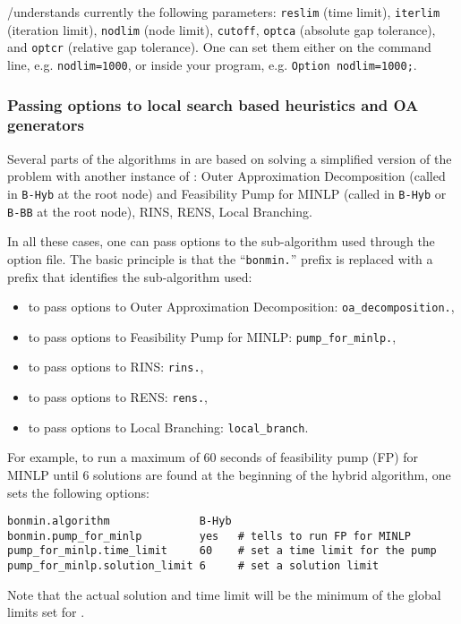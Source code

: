 \MYGAMS/\BONMIN understands currently the following \MYGAMS parameters: \texttt{reslim} (time limit), \texttt{iterlim} (iteration limit), \texttt{nodlim} (node limit), \texttt{cutoff}, \texttt{optca} (absolute gap tolerance), and \texttt{optcr} (relative gap tolerance).
One can set them either on the command line, e.g. \verb+nodlim=1000+, or inside your \MYGAMS program, e.g. \verb+Option nodlim=1000;+.

\subsubsection{Passing options to local search based heuristics and OA generators}
Several parts of the algorithms in \BONMIN are based on solving a simplified version of the problem with another instance of \BONMIN:
Outer Approximation Decomposition (called in {\tt B-Hyb} at the root node)
and Feasibility Pump for MINLP (called in {\tt B-Hyb} or {\tt B-BB} at the root node), RINS, RENS, Local Branching.

In all these cases, one can pass options to the sub-algorithm used through the option file.
The basic principle is that the ``\texttt{bonmin.}'' prefix  is replaced with a prefix that identifies the sub-algorithm used:
\begin{itemize}
\vspace{-2ex}
\setlength{\parskip}{.2ex}
\setlength{\itemsep}{0pt}
\setlength{\partopsep}{0pt}
\item to pass options to Outer Approximation Decomposition: {\tt oa\_decomposition.},
\item to pass options to Feasibility Pump for MINLP: {\tt pump\_for\_minlp.},
\item to pass options to RINS: {\tt rins.},
\item to pass options to RENS: {\tt rens.},
\item to pass options to Local Branching: {\tt local\_branch}.
\end{itemize}

\vspace{-2ex}
For example, to run a maximum of 60 seconds of feasibility pump (FP) for MINLP until 6 solutions are found at the beginning of the hybrid algorithm, one sets the following options:
\begin{verbatim}
bonmin.algorithm              B-Hyb
bonmin.pump_for_minlp         yes   # tells to run FP for MINLP
pump_for_minlp.time_limit     60    # set a time limit for the pump
pump_for_minlp.solution_limit 6     # set a solution limit
\end{verbatim}
Note that the actual solution and time limit will be the minimum of the global limits set for \BONMIN.


